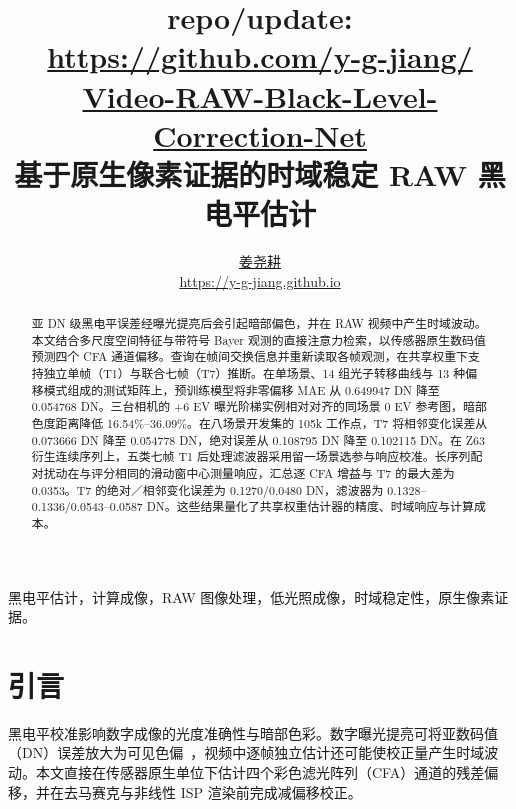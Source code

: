 
\usepackage{xeCJK}
\renewcommand{\figurename}{图}
\renewcommand{\tablename}{表}

\title{{\small\ttfamily repo/update: \href{https://github.com/y-g-jiang/Video-RAW-Black-Level-Correction-Net}{https://github.com/y-g-jiang/}\\\href{https://github.com/y-g-jiang/Video-RAW-Black-Level-Correction-Net}{Video-RAW-Black-Level-Correction-Net}}\\[0.8em]基于原生像素证据的时域稳定 RAW 黑电平估计}
\author{\href{https://y-g-jiang.github.io}{姜尧耕}\\\url{https://y-g-jiang.github.io}}
\maketitle
\begin{abstract}
亚 DN 级黑电平误差经曝光提亮后会引起暗部偏色，并在 RAW 视频中产生时域波动。本文结合多尺度空间特征与带符号 Bayer 观测的直接注意力检索，以传感器原生数码值预测四个 CFA 通道偏移。查询在帧间交换信息并重新读取各帧观测，在共享权重下支持独立单帧（T1）与联合七帧（T7）推断。在单场景、14 组光子转移曲线与 13 种偏移模式组成的测试矩阵上，预训练模型将非零偏移 MAE 从 0.649947 DN 降至 0.054768 DN。三台相机的 +6 EV 曝光阶梯实例相对对齐的同场景 0 EV 参考图，暗部色度距离降低 16.54\%--36.09\%。在八场景开发集的 105k 工作点，T7 将相邻变化误差从 0.073666 DN 降至 0.054778 DN，绝对误差从 0.108795 DN 降至 0.102115 DN。在 Z63 衍生连续序列上，五类七帧 T1 后处理滤波器采用留一场景选参与响应校准。长序列配对扰动在与评分相同的滑动窗中心测量响应，汇总逐 CFA 增益与 T7 的最大差为 0.0353。T7 的绝对／相邻变化误差为 0.1270/0.0480 DN，滤波器为 0.1328--0.1336/0.0543--0.0587 DN。这些结果量化了共享权重估计器的精度、时域响应与计算成本。
\end{abstract}
\begin{IEEEkeywords}
黑电平估计，计算成像，RAW 图像处理，低光照成像，时域稳定性，原生像素证据。
\end{IEEEkeywords}

\section{引言}
黑电平校准影响数字成像的光度准确性与暗部色彩。数字曝光提亮可将亚数码值（DN）误差放大为可见色偏~\cite{ptc_quant}，视频中逐帧独立估计还可能使校正量产生时域波动。本文直接在传感器原生单位下估计四个彩色滤光阵列（CFA）通道的残差偏移，并在去马赛克与非线性 ISP 渲染前完成减偏移校正。

